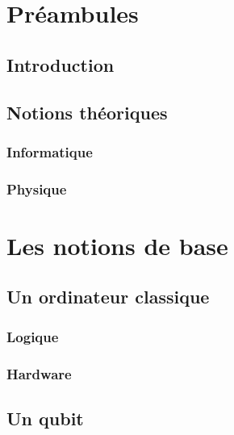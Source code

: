 \documentclass[11pt]{report}
\renewcommand{\thepage}{}
\begin{document}
\begin{abstract}

\lipsum[1-1]

\end{abstract}
\clearpage


\renewcommand{\thepage}{\arabic{page}}
\setcounter{page}{1}
\pagestyle{fancy}

\tableofcontents
\clearpage

\part{Préambules}
\chapter{Introduction}
\lipsum[2-4]

\chapter{Notions théoriques}
\section{Informatique}
\lipsum[2-4]

\section{Physique}
\lipsum[2-4]

\part{Les notions de base}
\chapter{Un ordinateur classique}
\section{Logique}
\lipsum[2-4]
\section{Hardware}
\lipsum[2-4]

\chapter{Un qubit}
\end{document}
